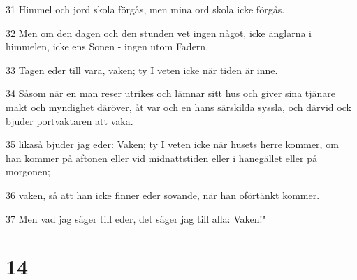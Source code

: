 \par 31 Himmel och jord skola förgås, men mina ord skola icke förgås.
\par 32 Men om den dagen och den stunden vet ingen något, icke änglarna i himmelen, icke ens Sonen - ingen utom Fadern.
\par 33 Tagen eder till vara, vaken; ty I veten icke när tiden är inne.
\par 34 Såsom när en man reser utrikes och lämnar sitt hus och giver sina tjänare makt och myndighet däröver, åt var och en hans särskilda syssla, och därvid ock bjuder portvaktaren att vaka.
\par 35 likaså bjuder jag eder: Vaken; ty I veten icke när husets herre kommer, om han kommer på aftonen eller vid midnattstiden eller i hanegället eller på morgonen;
\par 36 vaken, så att han icke finner eder sovande, när han oförtänkt kommer.
\par 37 Men vad jag säger till eder, det säger jag till alla: Vaken!"

\chapter{14}

